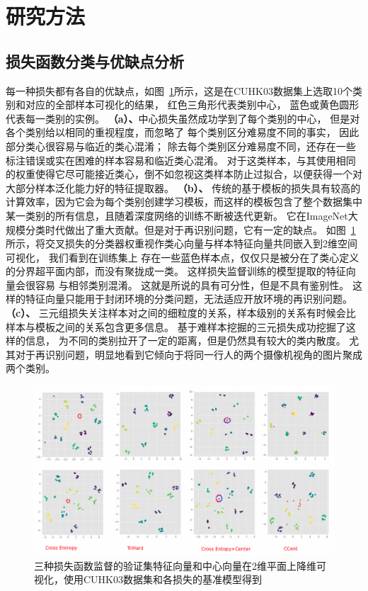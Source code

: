 \section{研究方法}
\subsection{损失函数分类与优缺点分析}
每一种损失都有各自的优缺点，如图~\ref{fig:losses}所示，这是在CUHK03数据集上选取10个类别和对应的全部样本可视化的结果，
红色三角形代表类别中心，
蓝色或黄色圆形代表每一类别的实例。
\textbf{（a）、}中心损失虽然成功学到了每个类别的中心，
但是对各个类别给以相同的重视程度，而忽略了
每个类别区分难易度不同的事实，
因此部分类心很容易与临近的类心混淆；
除去每个类别区分难易度不同，还存在一些标注错误或实在困难的样本容易和临近类心混淆。
对于这类样本，与其使用相同的权重使得它尽可能接近类心，倒不如忽视这类样本防止过拟合，以便获得一个对大部分样本泛化能力好的特征提取器。
\textbf{（b）、}
传统的基于模板的损失具有较高的计算效率，因为它会为每个类别创建学习模板，而这样的模板包含了整个数据集中某一类别的所有信息，且随着深度网络的训练不断被迭代更新。
它在ImageNet大规模分类时代做出了重大贡献。但是对于再识别问题，它有一定的缺点。
如图~\ref{fig:losses}所示，将交叉损失的分类器权重视作类心向量与样本特征向量共同嵌入到2维空间可视化，
我们看到在训练集上
存在一些蓝色样本点，仅仅只是被分在了类心定义的分界超平面内部，而没有聚拢成一类。
这样损失监督训练的模型提取的特征向量会很容易
与相邻类别混淆。
这就是所说的具有可分性，但是不具有鉴别性。
这样的特征向量只能用于封闭环境的分类问题，无法适应开放环境的再识别问题。
\textbf{（c）、}
三元组损失关注样本对之间的细粒度的关系，样本级别的关系有时候会比样本与模板之间的关系包含更多信息。
基于难样本挖掘的三元损失成功挖掘了这样的信息，
为不同的类别拉开了一定的距离，但是仍然具有较大的类内散度。
尤其对于再识别问题，明显地看到它倾向于将同一行人的两个摄像机视角的图片聚成两个类别。

\begin{figure}
	\centering
	\includegraphics[width=\textwidth]{fig/2018-05-16-15-03-54.png}
	\caption{三种损失函数监督的验证集特征向量和中心向量在2维平面上降维可视化，使用CUHK03数据集和各损失的基准模型得到}
	\label{fig:losses}
\end{figure}

